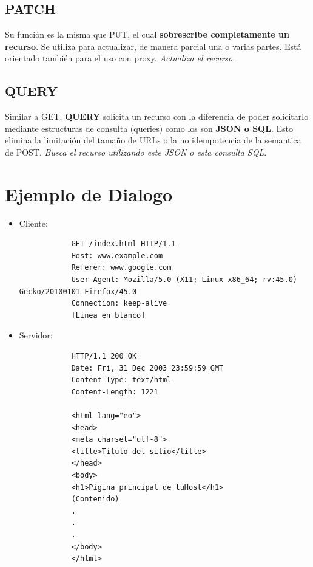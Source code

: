 \documentclass[a4paper,10pt]{article}
\begin{document}
\subsection{PATCH}
Su función es la misma que PUT, el cual \textbf{sobrescribe completamente un recurso}. Se utiliza para actualizar, de manera parcial una o varias partes. Está orientado también para el uso con proxy.
\textit{Actualiza el recurso}.

\subsection{QUERY}
Similar a GET, \textbf{QUERY} solicita un recurso con la diferencia de poder solicitarlo mediante estructuras de consulta (queries) como los son \textbf{JSON o SQL}.
Esto elimina la limitación del tamaño de URLs o la no idempotencia de la semantica de POST.
\textit{Busca el recurso utilizando este JSON o esta consulta SQL}.



\section{Ejemplo de Dialogo}

\begin{itemize}
    \item Cliente: 
        \begin{lstlisting}
            GET /index.html HTTP/1.1
            Host: www.example.com
            Referer: www.google.com
            User-Agent: Mozilla/5.0 (X11; Linux x86_64; rv:45.0) Gecko/20100101 Firefox/45.0
            Connection: keep-alive
            [Linea en blanco]
        \end{lstlisting}

    \item Servidor:
    \begin{lstlisting}
            HTTP/1.1 200 OK
            Date: Fri, 31 Dec 2003 23:59:59 GMT
            Content-Type: text/html
            Content-Length: 1221

            <html lang="eo">
            <head>
            <meta charset="utf-8">
            <title>Titulo del sitio</title>
            </head>
            <body>
            <h1>Pigina principal de tuHost</h1>
            (Contenido)
            .
            .
            .
            </body>
            </html>
        \end{lstlisting}
\end{itemize}
\end{document}
